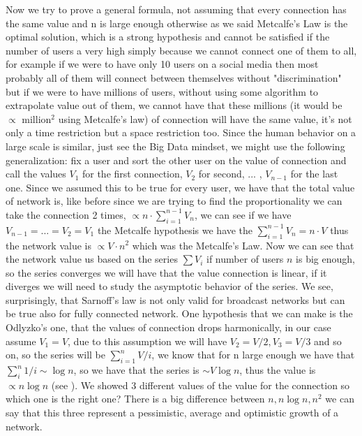 \documentclass[12pt, a4page]{article}
\begin{document}
Now we try to prove a general formula, not assuming that every connection has the same value and n is large enough otherwise as we said Metcalfe's Law is the optimal solution, which is a strong hypothesis and cannot be satisfied if the number of users a very high simply because we cannot connect one of them to all, for example if we were to have only 10 users on a social media then most probably all of them will connect between themselves without "discrimination" but if we were to have millions of users, without using some algorithm to extrapolate value out of them, we cannot have that these millions (it would be $\propto$ million$^2$ using Metcalfe's law) of connection will have the same value, it's not only a time restriction but a space restriction too. Since the human behavior on a large scale is similar, just see the Big Data mindset, we might use the following generalization:
fix a user and sort the other user on the value of connection and call the values $V_1$ for the first connection, $V_2$ for second, ... , $V_{n-1}$ for the last one.
\newline
Since we assumed this to be true for every user, we have that the total value of network is, like before since we are trying to find the proportionality we can take the connection 2 times, $\propto n \cdot \sum_{i=1}^{n-1} V_n$, we can see if we have $V_{n-1}=...=V_2=V_1$ the Metcalfe hypothesis we have the $ \sum_{i=1}^{n-1} V_n = n\cdot V$ thus the network value is $\propto V \cdot n^2$ which was the Metcalfe's Law.
Now we can see that the network value us based on the series $\sum V_i$ if number of users $n$ is big enough, so the series converges we will have that the value connection is linear, if it diverges we will need to study the asymptotic behavior of the series.
We see, surprisingly, that Sarnoff's law is not only valid for broadcast networks but can be true also for fully connected network.\newline
One hypothesis that we can make is the Odlyzko's one, that the values of connection drops harmonically, in our case assume $V_1 = V$, due to this assumption we will have $V_2 = V/2, V_3 = V/3$ and so on, so the series will be $\sum_{i=1}^n V/i$, we know that for n large enough we have that $\sum_i^n 1/i \sim \log n$, so we have that the series is $\sim V \log n$, thus the value is $\propto n \log n$ (see \cite{OdlyzkoLaw}).\newline
We showed 3 different values of the value for the connection so which one is the right one? There is a big difference between $n, n\log n, n^2$ we can say that this three represent a pessimistic, average and optimistic growth of a network.
\end{document}
